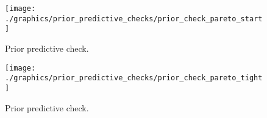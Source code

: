 \begin{figure}
    \texttt{[image: ./graphics/prior\_predictive\_checks/prior\_check\_pareto\_start]}
    \label{fig:ppc_start}
    \caption{Prior predictive check.}
\end{figure}

\begin{figure}
    \texttt{[image: ./graphics/prior\_predictive\_checks/prior\_check\_pareto\_tight]}
    \label{fig:ppc_tight}
    \caption{Prior predictive check.}
\end{figure}






